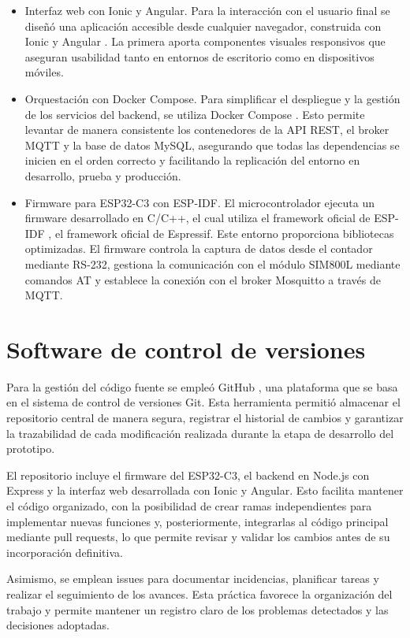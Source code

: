 \begin{itemize}
\item Interfaz web con Ionic y Angular.
Para la interacción con el usuario final se diseñó una aplicación accesible desde cualquier navegador, construida con Ionic \cite{ionic} y Angular \cite{angular}. La primera aporta componentes visuales responsivos que aseguran usabilidad tanto en entornos de escritorio como en dispositivos móviles.

\item Orquestación con Docker Compose.
Para simplificar el despliegue y la gestión de los servicios del backend, se utiliza Docker Compose \cite{docker_compose}. Esto permite levantar de manera consistente los contenedores de la API REST, el broker MQTT y la base de datos MySQL, asegurando que todas las dependencias se inicien en el orden correcto y facilitando la replicación del entorno en desarrollo, prueba y producción.

\item  Firmware para ESP32-C3 con ESP-IDF.
El microcontrolador ejecuta un firmware desarrollado en C/C++, el cual utiliza el framework oficial de ESP-IDF \cite{espidf}, el framework oficial de Espressif. Este entorno proporciona bibliotecas optimizadas. El firmware controla la captura de datos desde el contador mediante RS-232, gestiona la comunicación con el módulo SIM800L mediante comandos AT y establece la conexión con el broker Mosquitto a través de MQTT.

\end{itemize}


\section{Software de control de versiones}
Para la gestión del código fuente se empleó GitHub \cite{github}, una plataforma que se basa en el sistema de control de versiones Git. Esta herramienta permitió almacenar el repositorio central de manera segura, registrar el historial de cambios y garantizar la trazabilidad de cada modificación realizada durante la etapa de desarrollo del prototipo.

El repositorio incluye el firmware del ESP32-C3, el backend en Node.js con Express y la interfaz web desarrollada con Ionic y Angular. Esto facilita mantener el código organizado, con la posibilidad de crear ramas independientes para implementar nuevas funciones y, posteriormente, integrarlas al código principal mediante pull requests, lo que permite revisar y validar los cambios antes de su incorporación definitiva.

Asimismo, se emplean issues para documentar incidencias, planificar tareas y realizar el seguimiento de los avances. Esta práctica favorece la organización del trabajo y permite mantener un registro claro de los problemas detectados y las decisiones adoptadas.


